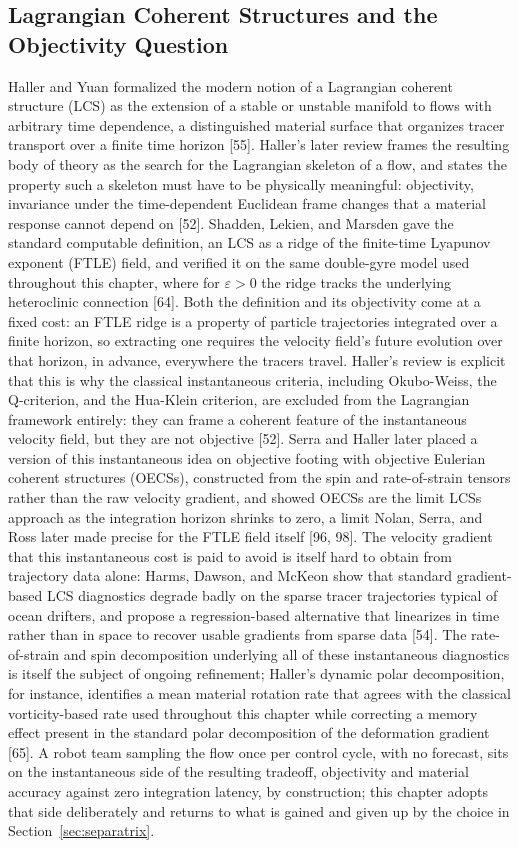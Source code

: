 \documentclass[12pt, letterpaper, oneside]{report}
\begin{document}
\subsection{Lagrangian Coherent Structures and the Objectivity Question}

Haller and Yuan formalized the modern notion of a Lagrangian coherent
structure (LCS) as the extension of a stable or unstable manifold to flows
with arbitrary time dependence, a distinguished material surface that
organizes tracer transport over a finite time horizon [55]. Haller's later
review frames the resulting body of theory as the search for the
Lagrangian skeleton of a flow, and states the property such a skeleton must
have to be physically meaningful: objectivity, invariance under the
time-dependent Euclidean frame changes that a material response cannot
depend on [52]. Shadden, Lekien, and Marsden gave the standard computable
definition, an LCS as a ridge of the finite-time Lyapunov exponent (FTLE)
field, and verified it on the same double-gyre model used throughout this
chapter, where for $\varepsilon>0$ the ridge tracks the underlying
heteroclinic connection [64]. Both the definition and its objectivity come
at a fixed cost: an FTLE ridge is a property of particle trajectories
integrated over a finite horizon, so extracting one requires the velocity
field's future evolution over that horizon, in advance, everywhere the
tracers travel. Haller's review is explicit that this is why the classical
instantaneous criteria, including Okubo-Weiss, the Q-criterion, and the
Hua-Klein criterion, are excluded from the Lagrangian framework entirely:
they can frame a coherent feature of the instantaneous velocity field, but
they are not objective [52]. Serra and Haller later placed a version of
this instantaneous idea on objective footing with objective Eulerian
coherent structures (OECSs), constructed from the spin and rate-of-strain
tensors rather than the raw velocity gradient, and showed OECSs are the
limit LCSs approach as the integration horizon shrinks to zero, a limit
Nolan, Serra, and Ross later made precise for the FTLE field itself [96,
98]. The velocity gradient that this instantaneous cost is paid to avoid is
itself hard to obtain from trajectory data alone: Harms, Dawson, and McKeon
show that standard gradient-based LCS diagnostics degrade badly on the
sparse tracer trajectories typical of ocean drifters, and propose a
regression-based alternative that linearizes in time rather than in space
to recover usable gradients from sparse data [54]. The rate-of-strain and
spin decomposition underlying all of these instantaneous diagnostics is
itself the subject of ongoing refinement; Haller's dynamic polar
decomposition, for instance, identifies a mean material rotation rate that
agrees with the classical vorticity-based rate used throughout this chapter
while correcting a memory effect present in the standard polar
decomposition of the deformation gradient [65]. A robot team sampling the
flow once per control cycle, with no forecast, sits on the instantaneous
side of the resulting tradeoff, objectivity and material accuracy against
zero integration latency, by construction; this chapter adopts that side
deliberately and returns to what is gained and given up by the choice in
Section~\ref{sec:separatrix}.
\end{document}
